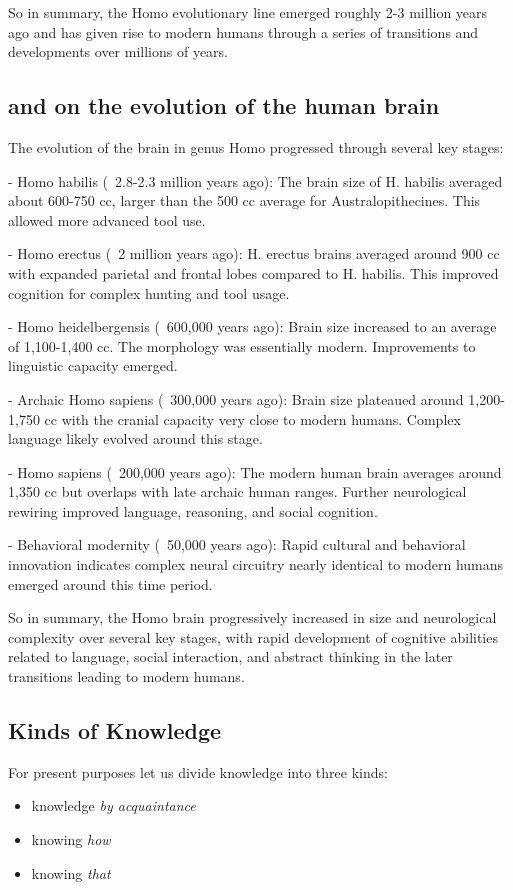\documentclass[10pt,titlepage]{book}
\begin{document}
So in summary, the Homo evolutionary line emerged roughly 2-3 million years ago and has given rise to modern humans through a series of transitions and developments over millions of years.

\subsection{and on the evolution of the human brain}

The evolution of the brain in genus Homo progressed through several key stages:

- Homo habilis (~2.8-2.3 million years ago): The brain size of H. habilis averaged about 600-750 cc, larger than the 500 cc average for Australopithecines. This allowed more advanced tool use.

- Homo erectus (~2 million years ago): H. erectus brains averaged around 900 cc with expanded parietal and frontal lobes compared to H. habilis. This improved cognition for complex hunting and tool usage.

- Homo heidelbergensis (~600,000 years ago): Brain size increased to an average of 1,100-1,400 cc. The morphology was essentially modern. Improvements to linguistic capacity emerged.

- Archaic Homo sapiens (~300,000 years ago): Brain size plateaued around 1,200-1,750 cc with the cranial capacity very close to modern humans. Complex language likely evolved around this stage.

- Homo sapiens (~200,000 years ago): The modern human brain averages around 1,350 cc but overlaps with late archaic human ranges. Further neurological rewiring improved language, reasoning, and social cognition. 

- Behavioral modernity (~50,000 years ago): Rapid cultural and behavioral innovation indicates complex neural circuitry nearly identical to modern humans emerged around this time period.

So in summary, the Homo brain progressively increased in size and neurological complexity over several key stages, with rapid development of cognitive abilities related to language, social interaction, and abstract thinking in the later transitions leading to modern humans.

\subsection{Kinds of Knowledge}
For present purposes let us divide knowledge into three kinds:
\begin{itemize}
\item knowledge \emph{by acquaintance}
\item knowing \emph{how}
\item knowing \emph{that}
\end{itemize}
\end{document}
